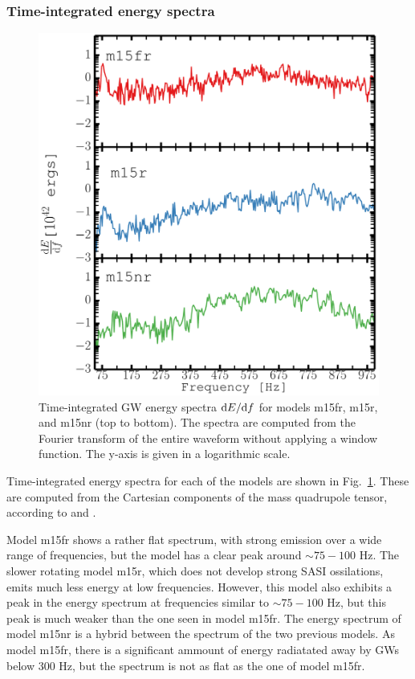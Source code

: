 \subsubsection{Time-integrated energy spectra}
\begin{figure}
\centering                            
\includegraphics[width=0.79\linewidth]{./images/paper2/dedv_rot.pdf}
\caption{Time-integrated GW energy spectra $\mathrm{d} E/ \mathrm{d} f$ for models m15fr,
m15r, and  m15nr (top to bottom). The spectra
are computed from the Fourier transform of the entire waveform
without applying a window function. The y-axis is given in a logarithmic scale.
\label{figp2:energy_spectra}}
\end{figure}
Time-integrated energy spectra for each of the models are shown
in Fig.~\ref{figp2:energy_spectra}. These are computed from
the Cartesian components of the mass quadrupole tensor, according to
 and .

Model m15fr shows a rather flat spectrum, with strong emission over a wide range of frequencies, but
the model has a clear peak around $\sim 75-100$ Hz. The slower rotating model m15r, which does not
develop strong SASI ossilations, emits much less energy at low frequencies. However, this model also
exhibits a peak in the energy spectrum at frequencies similar to $\sim 75-100$ Hz, but
this peak is much weaker than the one seen in model m15fr.
The energy spectrum of model m15nr is a hybrid between the spectrum of the two previous models. 
As model m15fr, there is a significant ammount of energy radiatated away by GWs below 300 Hz, but 
the spectrum is not as flat as the one of model m15fr. 

